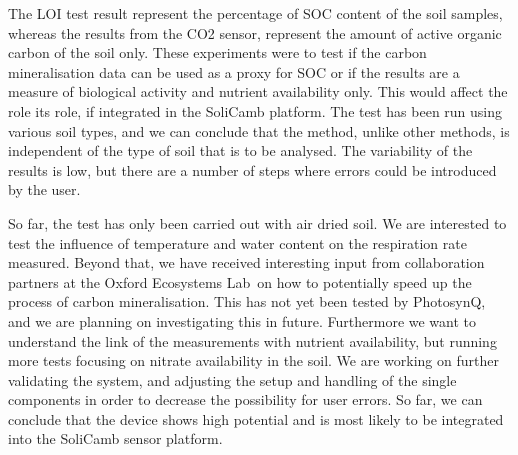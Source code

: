 
The \gls{LOI} test result represent the percentage of \gls{SOC} content of the soil samples, whereas the results from the \gls{CO2} sensor, represent the amount of active organic carbon of the soil only. These experiments were to test if the carbon mineralisation data can be used as a proxy for \gls{SOC} or if the results are a measure of biological activity and nutrient availability only. This would affect the role its role, if integrated in the SoliCamb platform. The test has been run using various soil types, and we can conclude that the method, unlike other methods, is independent of the type of soil that is to be analysed. The variability of the results is low, but there are a number of steps where errors could be introduced by the user. 

So far, the test has only been carried out with air dried soil. We are interested to test the influence of temperature and water content on the respiration rate measured. Beyond that, we have received interesting input from collaboration partners at the Oxford Ecosystems Lab on how to potentially speed up the process of carbon mineralisation. This has not yet been tested by PhotosynQ, and we are planning on investigating this in future. Furthermore we want to understand the link of the measurements with nutrient availability, but running more tests focusing on nitrate availability in the soil. We are working on further validating the system, and adjusting the setup and handling of the single components in order to decrease the possibility for user errors. So far, we can conclude that the device shows high potential and is most likely to be integrated into the SoliCamb sensor platform. 

